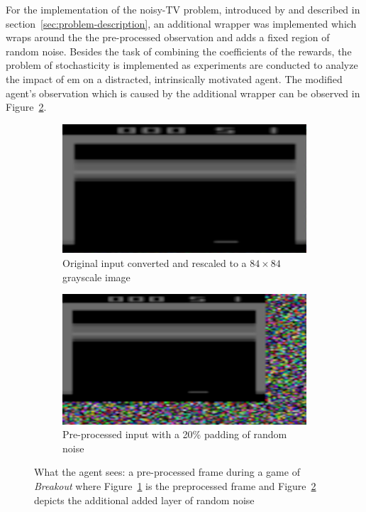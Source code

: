 \documentclass[draft,final]{vutinfth} %
\begin{document}
    For the implementation of the noisy-TV problem, introduced by \citeauthor{schmidhuber_formal_2010} and described in section~\ref{sec:problem-description}, an additional wrapper was implemented which wraps around the the pre-processed observation and adds a fixed region of random noise.
    Besides the task of combining the coefficients of the rewards, the problem of stochasticity is implemented as experiments are conducted to analyze the impact of \gls{em} on a distracted, intrinsically motivated agent.
    The modified agent's observation which is caused by the additional wrapper can be observed in Figure~\ref{fig:tv_noise}.

    \begin{figure}[h]
        \begin{center}
            \begin{subfigure}{.40\textwidth}
                \centering
                \includegraphics[width=.9\linewidth]{figures/TV.PNG}
                \caption{Original input converted and rescaled to a $84 \times 84$ grayscale image}
                \label{fig:tv}
            \end{subfigure}%
            \hspace{0.05\textwidth}
            \begin{subfigure}{.40\textwidth}
                \centering
                \includegraphics[width=.9\linewidth]{figures/TV_noise.PNG}
                \caption{Pre-processed input with a 20\% padding of random noise}
                \label{fig:tv_noise}
            \end{subfigure}
            \caption[What the agent sees: a pre-processed frame during a game of \textit{Breakout}]{What the agent sees: a pre-processed frame during a game of \textit{Breakout} where Figure~\ref{fig:tv} is the preprocessed frame and Figure~\ref{fig:tv_noise} depicts the additional added layer of random noise}
            \label{fig:observation}
        \end{center}
    \end{figure}
\end{document}
